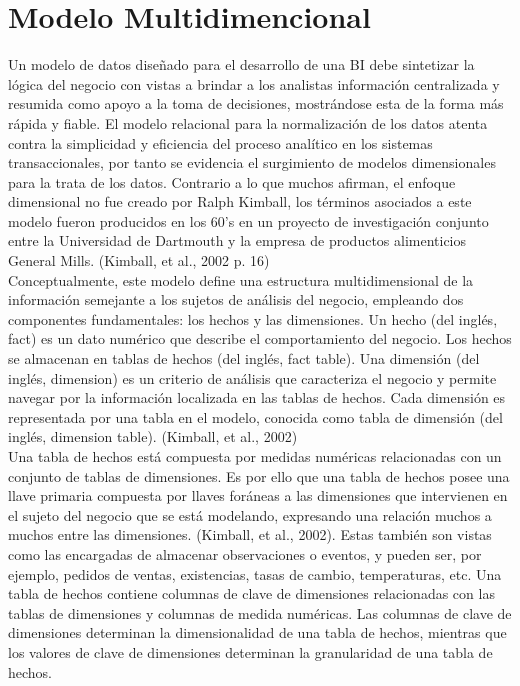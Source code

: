 \section*{Modelo Multidimencional}\label{multidim_model}
Un modelo de datos diseñado para el desarrollo de una BI debe sintetizar la lógica del negocio con vistas a brindar a los analistas información centralizada y resumida como apoyo a la toma de decisiones, mostrándose esta de la forma más rápida y fiable. El modelo relacional para la normalización de los datos atenta contra la simplicidad y eficiencia del proceso analítico en los sistemas transaccionales, por tanto se evidencia el surgimiento de modelos dimensionales para la trata de los datos. Contrario a lo que muchos afirman, el enfoque dimensional no fue creado por Ralph Kimball, los términos asociados a este modelo fueron producidos en los 60’s en un proyecto de investigación conjunto entre la Universidad de Dartmouth y la empresa de productos alimenticios General Mills. (Kimball, et al., 2002 p. 16)\\

Conceptualmente, este modelo define una estructura multidimensional de la información semejante a los sujetos de análisis del negocio, empleando dos componentes fundamentales: los hechos y las dimensiones. Un hecho (del inglés, fact) es un dato numérico que describe el comportamiento del negocio. Los hechos se almacenan en tablas de hechos (del inglés, fact table). Una dimensión (del inglés, dimension) es un criterio de análisis que caracteriza el negocio y permite navegar por la información localizada en las tablas de hechos. Cada dimensión es representada por una tabla en el modelo, conocida como tabla de dimensión (del inglés, dimension table). (Kimball, et al., 2002) \\

Una tabla de hechos está compuesta por medidas numéricas relacionadas con un conjunto de tablas de dimensiones. Es por ello que una tabla de hechos posee una llave primaria compuesta por llaves foráneas a las dimensiones que intervienen en el sujeto del negocio que se está modelando, expresando una relación muchos a muchos entre las dimensiones. (Kimball, et al., 2002). Estas también son vistas como las encargadas de almacenar observaciones o eventos, y pueden ser, por ejemplo, pedidos de ventas, existencias, tasas de cambio, temperaturas, etc. Una tabla de hechos contiene columnas de clave de dimensiones relacionadas con las tablas de dimensiones y columnas de medida numéricas. Las columnas de clave de dimensiones determinan la dimensionalidad de una tabla de hechos, mientras que los valores de clave de dimensiones determinan la granularidad de una tabla de hechos.\\

